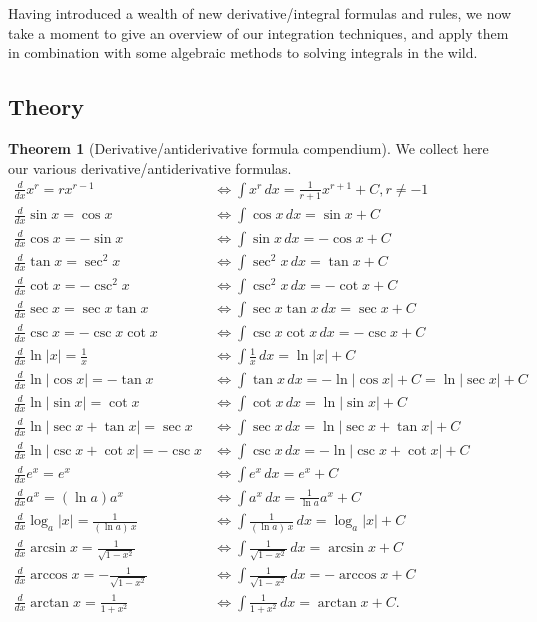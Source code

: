 \documentclass[11pt]{article}
\theoremstyle{definition}
\theoremstyle{named}
\newtheorem*{namedtheorem}{Theorem}
\numberwithin{myalgctr}{section}
\begin{document}
\thispagestyle{fancy}
Having introduced a wealth of new derivative/integral formulas and rules, we now take a moment to give an overview of our integration techniques, and apply them in combination with some algebraic methods to solving integrals in the wild.

 \subsection*{Theory}
\begin{namedtheorem}[Derivative/antiderivative formula compendium] We collect here our various derivative/antiderivative formulas.
\begin{align*}
  \frac{d}{dx} x^r=rx^{r-1}& \iff \int x^r \, dx=\frac{1}{r+1}x^{r+1}+C, r\ne -1\\
  \frac{d}{dx} \sin x=\cos x& \iff \int\cos x \, dx=\sin x+C\\
  \frac{d}{dx}\cos x=-\sin x & \iff \int \sin x \, dx=-\cos x+C\\
  \frac{d}{dx}\tan x=\sec^2x & \iff \int \sec^2 x \, dx=\tan x+C\\
  \frac{d}{dx}\cot x=-\csc^2x & \iff \int \csc ^2x\, dx=-\cot x+C\\
  \frac{d}{dx}\sec x=\sec x\tan x & \iff \int \sec x\tan x \, dx=\sec x+C\\
  \frac{d}{dx}\csc x=-\csc x\cot x & \iff \int\csc x\cot x \, dx=-\csc x+C\\
  \frac{d}{dx}\ln\vert x\vert=\frac{1}{x} & \iff \int\frac{1}{x} \, dx=\ln\vert x\vert+C \\
  \frac{d}{dx}\ln\vert \cos x \vert=-\tan x & \iff \int\tan x \, dx=-\ln\vert \cos x \vert+C=\ln\vert\sec x\vert+C \\
  \frac{d}{dx}\ln\vert \sin x\vert=\cot x & \iff \int\cot x \, dx=\ln\vert \sin x\vert+C \\
  \frac{d}{dx}\ln\vert \sec x+\tan x\vert=\sec x & \iff \int\sec x \, dx=\ln\vert \sec x+\tan x\vert+C \\
  \frac{d}{dx}\ln\vert \csc x+\cot x\vert=-\csc x & \iff \int\csc x \, dx=-\ln\vert \csc x+\cot x\vert+C\\
  \frac{d}{dx}e^x=e^x & \iff \int e^x \, dx=e^x+C\\
  \frac{d}{dx}a^x=(\ln a)a^x & \iff \int a^x \, dx=\frac{1}{\ln a}a^x+C\\
  \frac{d}{dx}\log_a \vert x\vert =\frac{1}{(\ln a)\, x} & \iff \int \frac{1}{(\ln a)\, x} \, dx=\log_a\vert x\vert+C\\
  \frac{d}{dx} \arcsin x=\frac{1}{\sqrt{1-x^2}}&\iff \int \frac{1}{\sqrt{1-x^2}}\, dx=\arcsin x+C \\
  \frac{d}{dx} \arccos x=-\frac{1}{\sqrt{1-x^2}}&\iff \int \frac{1}{\sqrt{1-x^2}}\, dx=-\arccos x+C \\
  \frac{d}{dx} \arctan x=\frac{1}{1+x^2}&\iff \int \frac{1}{1+x^2}\, dx=\arctan x+C .
\end{align*}

\end{namedtheorem}
\end{document}
